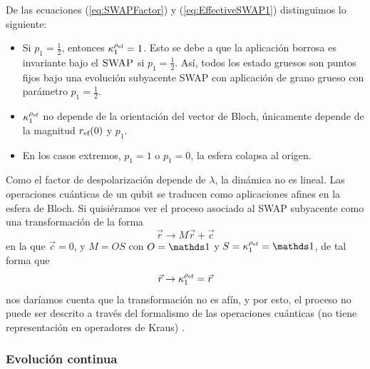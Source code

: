 De las ecuaciones (\ref{eq:SWAPFactor}) y (\ref{eq:EffectiveSWAP1}) distinguimos lo siguiente:
\begin{itemize}
  \item Si $p_{1}=\frac{1}{2}$, entonces $\kappa_{1}^{\rho_{\text{ef}}}=1$. Esto se debe a que la aplicación borrosa es invariante bajo el $\textsc{SWAP}$ si $p_{1}=\frac{1}{2}$. Así, todos los estado gruesos son puntos fijos bajo una evolución subyacente SWAP con aplicación de grano grueso con parámetro $p_{1}=\frac{1}{2}$.
  \item $\kappa_{1}^{\rho_{\text{ef}}}$ no depende de la orientación del vector de Bloch, únicamente depende de la magnitud $r_{\text{ef}}(0)$ y $p_{1}$.
  \item En los casos extremos, $p_{1}=1$ o $p_{1}=0$, la esfera colapsa al origen.
\end{itemize}


Como el factor de despolarización depende de $\lambda$, la dinámica no es lineal. Las operaciones cuánticas de un qubit se traducen como aplicaciones afines en la esfera de Bloch. Si quisiéramos ver el proceso asociado al \textsc{SWAP} subyacente como una transformación de la forma
\begin{equation}
  \vec{r}\rightarrow M\vec{r}+\vec{c}\nonumber
\end{equation}
en la que $\vec{c}=0$, y $M=OS$ con $O=\Id$ y $S=\kappa_{1}^{\rho_{\ef}}=\Id$, de tal forma que
\begin{equation}
  \vec{r}\rightarrow \kappa_{1}^{\rho_{\text{ef}}}=\vec{r}\nonumber
\end{equation}
nos daríamos cuenta que la transformación no es afín, y por esto, el proceso no puede ser descrito a través del formalismo de las operaciones cuánticas (no tiene representación en operadores de Kraus) \cite{Chuang}.

\subsubsection{Evolución continua}

